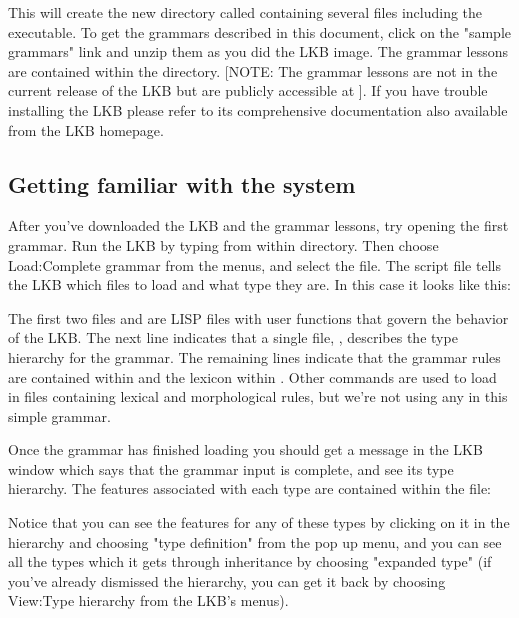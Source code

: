 
\noindent This will create the new directory called  containing several files including the  executable.  To get the grammars described in this document, click on the "sample grammars" link and unzip them as you did the LKB image.  The grammar lessons are contained within the   directory.  [NOTE: The grammar lessons are not in the current release of the LKB but are publicly accessible at ].  If you have trouble installing the LKB please refer to its comprehensive documentation also available from the LKB homepage.



\subsection{Getting familiar with the system}

After you've downloaded the LKB and the grammar lessons, try opening the first grammar.  Run the LKB by typing  from within  directory.  Then choose Load:Complete grammar from the menus, and select the   file.  The script file tells the LKB which files to load and what type they are.  In this case it looks like this:


The first two files   and   are LISP files with user functions that govern the behavior of the LKB.  The next line indicates that a single file, , describes the type hierarchy for the grammar.  The remaining lines indicate that the grammar rules are contained within  and the lexicon within .  Other commands are used to load in files containing lexical and morphological rules, but we're not using any in this simple grammar. 

Once the grammar has finished loading you should get a message in the LKB window which says that the grammar input is complete, and see its type hierarchy.  The features associated with each type are contained within the   file:\\


Notice that you can see the features for any of these types by clicking on it in the hierarchy and choosing "type definition" from the pop up menu, and you can see all the types which it gets through inheritance by choosing "expanded type" (if you've already dismissed the hierarchy, you can get it back by choosing View:Type hierarchy from the LKB's menus).

